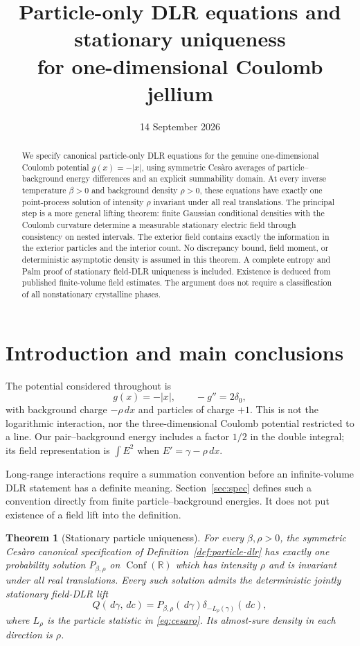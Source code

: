 \documentclass[11pt,reqno]{amsart}
\title[Particle DLR and stationary uniqueness for 1D jellium]{Particle-only DLR equations and stationary uniqueness\\for one-dimensional Coulomb jellium}
\date{14 September 2026}
\newtheorem{theorem}{Theorem}[section]
\theoremstyle{definition}
\theoremstyle{remark}
\newcommand{\R}{\mathbb R}
\newcommand{\1}{\mathbf 1}
\newcommand{\dd}{\,d}
\newcommand{\Conf}{\operatorname{Conf}}
\numberwithin{equation}{section}
\begin{document}
\begin{abstract}
We specify canonical particle-only DLR equations for the genuine
one-dimensional Coulomb potential $g(x)=-|x|$, using symmetric Ces\`aro
averages of particle--background energy differences and an explicit
summability domain. At every inverse temperature $\beta>0$ and background
density $\rho>0$, these equations have exactly one point-process solution
of intensity $\rho$ invariant under all real translations. The principal
step is a more general lifting theorem: finite Gaussian conditional
densities with the Coulomb curvature determine a measurable stationary
electric field through consistency on nested intervals. The exterior
field contains exactly the information in the exterior particles and
the interior count. No discrepancy bound, field moment, or deterministic
asymptotic density is assumed in this theorem. A complete entropy and
Palm proof of stationary field-DLR uniqueness is included. Existence is
deduced from published finite-volume field estimates. The argument does
not require a classification of all nonstationary crystalline phases.
\end{abstract}
\maketitle

\section{Introduction and main conclusions}

The potential considered throughout is
\[
g(x)=-|x|,\qquad -g''=2\delta_0,
\]
with background charge $-\rho\dd x$ and particles of charge $+1$.
This is not the logarithmic interaction, nor the three-dimensional
Coulomb potential restricted to a line. Our pair--background energy
includes a factor $1/2$ in the double integral; its field representation
is $\int E^2$ when $E'=\gamma-\rho\dd x$.

Long-range interactions require a summation convention before an
infinite-volume DLR statement has a definite meaning. Section~\ref{sec:spec}
defines such a convention directly from finite particle--background
energies. It does not put existence of a field lift into the definition.

\begin{theorem}[Stationary particle uniqueness]\label{thm:particle-main}
For every $\beta,\rho>0$, the symmetric Ces\`aro canonical specification
of Definition~\ref{def:particle-dlr} has exactly one probability solution
$P_{\beta,\rho}$ on $\Conf(\R)$ which has intensity $\rho$ and is
invariant under all real translations. Every such solution admits the
deterministic jointly stationary field-DLR lift
\[
Q(\dd\gamma,\dd c)=P_{\beta,\rho}(\dd\gamma)
\delta_{-L_\rho(\gamma)}(\dd c),
\]
where $L_\rho$ is the particle statistic in \eqref{eq:cesaro}.
Its almost-sure density in each direction is $\rho$.
\end{theorem}
\end{document}
